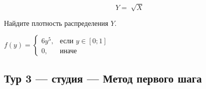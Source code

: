 \documentclass[12pt]{article}
\newenvironment{problem}{}{}
\newenvironment{sol}{}{} %
\begin{document}
\begin{enumerate}
\begin{problem}
\[Y = \sqrt[]{X}\]

Найдите плотность распределения $Y$.


\begin{sol}
\begin{center} $f(y) = \begin{cases} 6y^5, & \mbox{если } y \in [0;1] \\ 0 , & \mbox{иначе }  \end{cases}$  \end{center}

\end{sol}
\end{problem}
\end{enumerate}


\newpage
\subsection{Тур 3 — студия — Метод первого шага}
\end{document}
